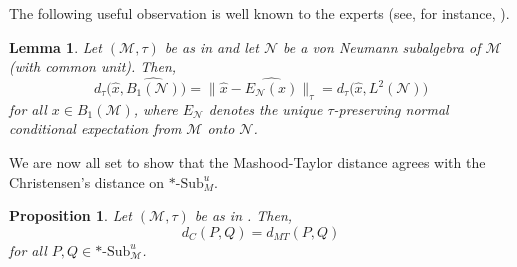 \documentclass{amsart}
\numberwithin{equation}{section}
\newcommand{\1}{\mathbf{1}}
\newcommand{\mM}{\mathcal{M}}
\newcommand{\mN}{\mathcal{N}}
\newtheorem{lemma}[theorem]{Lemma}
\newtheorem{proposition}[theorem]{Proposition}
\begin{document}
The following useful observation  is well known to the experts
(see, for instance, \cite[Eqn.(6)]{Ch1}).

\begin{lemma}\label{x-ENx-relation}
Let $(\mM, \tau)$ be as in  and let
 $\mN$ be a von Neumann subalgebra of $\mM$ (with common unit). Then,
\[
 d_\tau \Big(\widehat{x}, \widehat{B_1(\mN)}\Big)= \|\widehat{x}- \widehat{E_{\mN}(x)}\|_{\tau} =  d_\tau \Big(\widehat{x}, L^{2}(\mN)\Big)
\]
for all $x  \in B_1(\mM)$, where $E_{\mN}$ denotes the unique $\tau$-preserving normal conditional expectation from $\mM$ onto $\mN$.
\end{lemma}


We are now all set to show that the Mashood-Taylor distance agrees with
the Christensen's distance on $*\text{-Sub}_M^u$.
\begin{proposition}\label{dMT=dC}
Let $(\mM, \tau)$ be as in . Then,   
$$d_C(P, Q)= d_{MT}(P, Q)$$
for all $P, Q \in *\text{-}\mathrm{Sub}_{\mM}^u$.
\end{proposition}
\end{document}

